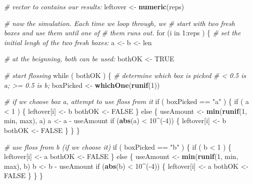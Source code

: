 \documentclass[]{book}
\makeatletter
\newenvironment{Shaded}{\begin{snugshade}}{\end{snugshade}}
\newcommand{\KeywordTok}[1]{\textcolor[rgb]{0.13,0.29,0.53}{\textbf{{#1}}}}
\newcommand{\DecValTok}[1]{\textcolor[rgb]{0.00,0.00,0.81}{{#1}}}
\newcommand{\StringTok}[1]{\textcolor[rgb]{0.31,0.60,0.02}{{#1}}}
\newcommand{\CommentTok}[1]{\textcolor[rgb]{0.56,0.35,0.01}{\textit{{#1}}}}
\newcommand{\OtherTok}[1]{\textcolor[rgb]{0.56,0.35,0.01}{{#1}}}
\newcommand{\NormalTok}[1]{{#1}}
\newenvironment{kframe}{%
\medskip{}
\setlength{\fboxsep}{.8em}
 \def\at@end@of@kframe{}%
 \ifinner\ifhmode%
  \def\at@end@of@kframe{\end{minipage}}%
  \begin{minipage}{\columnwidth}%
 \fi\fi%
 \def\FrameCommand##1{\hskip\@totalleftmargin \hskip-\fboxsep
 \colorbox{shadecolor}{##1}\hskip-\fboxsep
     \hskip-\linewidth \hskip-\@totalleftmargin \hskip\columnwidth}%
 \MakeFramed {\advance\hsize-\width
   \@totalleftmargin\z@ \linewidth\hsize
   \@setminipage}}%
 {\par\unskip\endMakeFramed%
 \at@end@of@kframe}
\renewenvironment{Shaded}{\begin{kframe}}{\end{kframe}}
\theoremstyle{definition}
\theoremstyle{definition}
\theoremstyle{remark}
\makeatother
\begin{document}
{\begin{Shaded}
\begin{Highlighting}[]
  \CommentTok{# vector to contains our results:}
  \NormalTok{leftover <-}\StringTok{ }\KeywordTok{numeric}\NormalTok{(reps)}
  
  \CommentTok{# now the simulation.  Each time we loop through, we}
  \CommentTok{# start with two fresh boxes and use them until one of}
  \CommentTok{# them runs out.}
  \NormalTok{for (i in }\DecValTok{1}\NormalTok{:reps ) \{}
    \CommentTok{# set the initial lengh of the two fresh boxes:}
    \NormalTok{a <-}\StringTok{ }\NormalTok{b <-}\StringTok{ }\NormalTok{len}
    
    \CommentTok{# at the beignning, both can be used:}
    \NormalTok{bothOK <-}\StringTok{ }\OtherTok{TRUE}
    
    \CommentTok{# start flossing}
    \NormalTok{while ( bothOK ) \{}
      \CommentTok{# determine which box is picked}
      \CommentTok{# < 0.5 is a; >= 0.5 is b;}
      \NormalTok{boxPicked <-}\StringTok{ }\KeywordTok{whichOne}\NormalTok{(}\KeywordTok{runif}\NormalTok{(}\DecValTok{1}\NormalTok{))}
      
      \CommentTok{# if we choose box a, attempt to use floss from it}
      \NormalTok{if ( boxPicked ==}\StringTok{ "a"} \NormalTok{) \{}
        \NormalTok{if ( a <}\StringTok{ }\DecValTok{1} \NormalTok{) \{}
          \NormalTok{leftover[i] <-}\StringTok{ }\NormalTok{b}
          \NormalTok{bothOK <-}\StringTok{ }\OtherTok{FALSE}
        \NormalTok{\} else \{}
          \NormalTok{useAmount <-}\StringTok{ }\KeywordTok{min}\NormalTok{(}\KeywordTok{runif}\NormalTok{(}\DecValTok{1}\NormalTok{, min, max), a)}
          \NormalTok{a <-}\StringTok{ }\NormalTok{a -}\StringTok{ }\NormalTok{useAmount}
          \NormalTok{if (}\KeywordTok{abs}\NormalTok{(a) <}\StringTok{ }\DecValTok{10}\NormalTok{^(-}\DecValTok{4}\NormalTok{)) \{}
            \NormalTok{leftover[i] <-}\StringTok{ }\NormalTok{b}
            \NormalTok{bothOK <-}\StringTok{ }\OtherTok{FALSE}
          \NormalTok{\}}
        \NormalTok{\}}
      \NormalTok{\}}
      
      \CommentTok{# use floss from b (if we choose it) }
      \NormalTok{if ( boxPicked ==}\StringTok{ "b"} \NormalTok{) \{}
        \NormalTok{if ( b <}\StringTok{ }\DecValTok{1} \NormalTok{) \{}
          \NormalTok{leftover[i] <-}\StringTok{ }\NormalTok{a}
          \NormalTok{bothOK <-}\StringTok{ }\OtherTok{FALSE}
        \NormalTok{\} else \{}
          \NormalTok{useAmount <-}\StringTok{ }\KeywordTok{min}\NormalTok{(}\KeywordTok{runif}\NormalTok{(}\DecValTok{1}\NormalTok{, min, max), b)}
          \NormalTok{b <-}\StringTok{ }\NormalTok{b -}\StringTok{ }\NormalTok{useAmount}
          \NormalTok{if (}\KeywordTok{abs}\NormalTok{(b) <}\StringTok{ }\DecValTok{10}\NormalTok{^(-}\DecValTok{4}\NormalTok{)) \{}
            \NormalTok{leftover[i] <-}\StringTok{ }\NormalTok{a}
            \NormalTok{bothOK <-}\StringTok{ }\OtherTok{FALSE}
          \NormalTok{\}}
        \NormalTok{\}}
      \NormalTok{\}}
        

\end{Highlighting}
\end{Shaded}}
\end{document}
